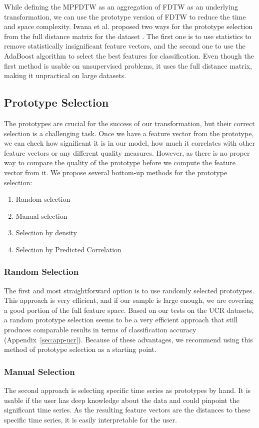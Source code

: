 While defining the MPFDTW as an aggregation of FDTW as an underlying transformation, we can use the prototype version of FDTW to reduce the time and space complexity. Iwana et al. proposed two ways for the prototype selection from the full distance matrix for the dataset \cite{met:protofDTW}. The first one is to use statistics to remove statistically insignificant feature vectors, and the second one to use the AdaBoost algorithm to select the best features for classification. Even though the first method is usable on unsupervised problems, it uses the full distance matrix, making it unpractical on large datasets.

\subsection{Prototype Selection}
The prototypes are crucial for the success of our transformation, but their correct selection is a challenging task. Once we have a feature vector from the prototype, we can check how significant it is in our model, how much it correlates with other feature vectors or any different quality measures.  However, as there is no proper way to compare the quality of the prototype before we compute the feature vector from it. We propose several bottom-up methods for the prototype selection:
\begin{enumerate}
    \item Random selection
    \item Manual selection
    \item Selection by density
    \item Selection by Predicted Correlation
\end{enumerate}

\subsubsection{Random Selection}
The first and most straightforward option is to use randomly selected prototypes. This approach is very efficient, and if our sample is large enough, we are covering a good portion of the full feature space. Based on our tests on the UCR datasets, a random prototype selection seems to be a very efficient approach that still produces comparable results in terms of classification accuracy (Appendix~\ref{sec:app-ucr}). Because of these advantages, we recommend using this method of prototype selection as a starting point.

\subsubsection{Manual Selection}
The second approach is selecting specific time series as prototypes by hand. It is usable if the user has deep knowledge about the data and could pinpoint the significant time series. As the resulting feature vectors are the distances to these specific time series, it is easily interpretable for the user.

